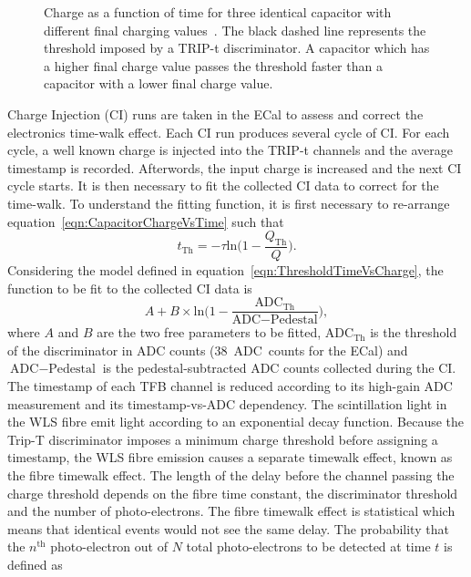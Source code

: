 {\begin{figure}[t!]
  \caption{Charge as a function of time for three identical capacitor with different final charging values~\cite{ND280CalibTN}.  The black dashed line represents the threshold imposed by a TRIP-t discriminator.  A capacitor which has a higher final charge value passes the threshold faster than a capacitor with a lower final charge value.}
  \label{fig:CapacitorChargingTime}
\end{figure}
\newline
\newline
Charge Injection (CI) runs are taken in the ECal to assess and correct the electronics time-walk effect.  Each CI run produces several cycle of CI.  For each cycle, a well known charge is injected into the TRIP-t channels and the average timestamp is recorded.  Afterwords, the input charge is increased and the next CI cycle starts.  It is then necessary to fit the collected CI data to correct for the time-walk.  To understand the fitting function, it is first necessary to re-arrange equation~\ref{eqn:CapacitorChargeVsTime} such that
\begin{equation}
t_{\textrm{Th}} = -\tau \textrm{ln}\big(1-\frac{Q_{\textrm{Th}}}{Q}\big).
\label{eqn:ThresholdTimeVsCharge}
\end{equation}
Considering the model defined in equation~\ref{eqn:ThresholdTimeVsCharge}, the function to be fit to the collected CI data is 
\begin{equation}
A + B\times\textrm{ln}\big(1 - \frac{\textrm{ADC}_{\textrm{Th}}}{\textrm{ADC} - \textrm{Pedestal}}\big),
\end{equation}
where $A$ and $B$ are the two free parameters to be fitted, $\textrm{ADC}_{\textrm{Th}}$ is the threshold of the discriminator in ADC counts (38~ADC~counts for the ECal) and $\textrm{ADC} - \textrm{Pedestal}$ is the pedestal-subtracted ADC counts collected during the CI.  The timestamp of each TFB channel is reduced according to its high-gain ADC measurement and its timestamp-vs-ADC dependency.
\newline
\newline
The scintillation light in the WLS fibre emit light according to an exponential decay function.  Because the Trip-T discriminator imposes a minimum charge threshold before assigning a timestamp, the WLS fibre emission causes a separate timewalk effect, known as the fibre timewalk effect.  The length of the delay before the channel passing the charge threshold depends on the fibre time constant, the discriminator threshold and the number of photo-electrons.  The fibre timewalk effect is statistical which means that identical events would not see the same delay.  The probability that the $n^{\textrm{th}}$ photo-electron out of $N$ total photo-electrons to be detected at time $t$ is defined as 
}
